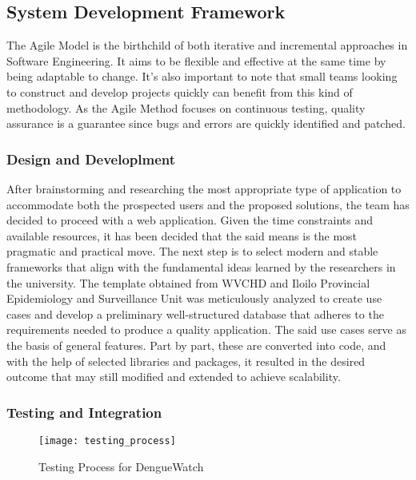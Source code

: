 \subsection{System Development Framework}
The Agile Model is the birthchild of both iterative and incremental approaches in Software Engineering. It aims to be flexible and effective at the same time by being adaptable to change. It's also important to note that small teams looking to construct and develop projects quickly can benefit from this kind of methodology. As the Agile Method focuses on continuous testing, quality assurance is a guarantee since bugs and errors are quickly identified and patched. 

\subsubsection{Design and Developlment}
After brainstorming and researching the most appropriate type of application to accommodate both the prospected users and the proposed solutions, the team has decided to proceed with a web application. Given the time constraints and available resources, it has been decided that the said means is the most pragmatic and practical move. The next step is to select modern and stable frameworks that align with the fundamental ideas learned by the researchers in the university. The template obtained from WVCHD and Iloilo Provincial Epidemiology and Surveillance Unit was meticulously analyzed to create use cases and develop a preliminary well-structured database that adheres to the requirements needed to produce a quality application. The said use cases serve as the basis of general features. Part by part, these are converted into code, and with the help of selected libraries and packages, it resulted in the desired outcome that may still modified and extended to achieve scalability. 

\subsubsection{Testing and Integration}
\begin{figure}[H]
	\centering
	\texttt{[image: testing\_process]}
	\caption{Testing Process for DengueWatch}
	\label{fig:testing-process}
\end{figure}

